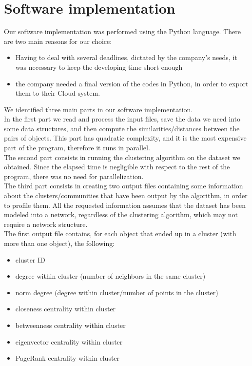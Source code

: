 \documentclass[a4paper,11pt]{book}
\begin{document}
\section{Software implementation}\label{sec:impl}
Our software implementation was performed using the Python language. There are two main reasons for our choice:
\begin{itemize}
\item Having to deal with several deadlines, dictated by the company's needs, it was necessary to keep the developing time short enough
\item the company needed a final version of the codes in Python, in order to export them to their Cloud system.
\end{itemize}
We identified three main parts in our software implementation.\\
In the first part we read and process the input files, save the data we need into some data structures, and then compute the similarities/distances between the pairs of objects. This part has quadratic complexity, and it is the most expensive part of the program, therefore it runs in parallel.\\
The second part consists in running the clustering algorithm on the dataset we obtained. Since the elapsed time is negligible with respect to the rest of the program, there was no need for parallelization.\\
The third part consists in creating two output files containing some information about the clusters/communities that have been output by the algorithm, in order to profile them. All the requested information assumes that the dataset has been modeled into a network, regardless of the clustering algorithm, which may not require a network structure.\\
The first output file contains, for each object that ended up in a cluster (with more than one object), the following:
\begin{itemize}
\item cluster ID
\item degree within cluster (number of neighbors in the same cluster)
\item norm degree (degree within cluster/number of points in the cluster)
\item closeness centrality within cluster
\item betweenness centrality within cluster
\item eigenvector centrality within cluster
\item PageRank centrality within cluster
\end{itemize}
\end{document}
